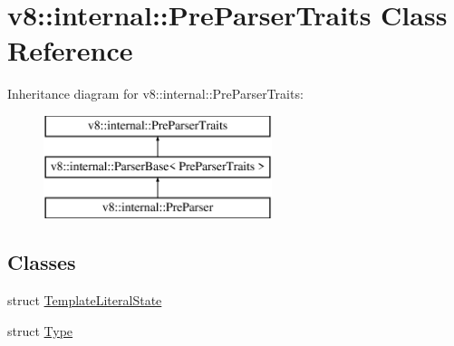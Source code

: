 \hypertarget{classv8_1_1internal_1_1_pre_parser_traits}{}\section{v8\+:\+:internal\+:\+:Pre\+Parser\+Traits Class Reference}
\label{classv8_1_1internal_1_1_pre_parser_traits}
Inheritance diagram for v8\+:\+:internal\+:\+:Pre\+Parser\+Traits\+:\begin{figure}[H]
\begin{center}
\leavevmode
\includegraphics[height=3.000000cm]{classv8_1_1internal_1_1_pre_parser_traits}
\end{center}
\end{figure}
\subsection*{Classes}
\begin{DoxyCompactItemize}
\item 
struct \hyperlink{structv8_1_1internal_1_1_pre_parser_traits_1_1_template_literal_state}{Template\+Literal\+State}
\item 
struct \hyperlink{structv8_1_1internal_1_1_pre_parser_traits_1_1_type}{Type}
\end{DoxyCompactItemize}
